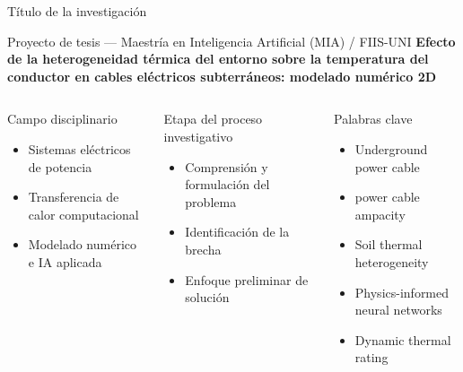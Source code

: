 \documentclass[aspectratio=169]{beamer}
\begin{document}
\begin{frame}{Título de la investigación}
  \begin{block}{Proyecto de tesis --- Maestría en Inteligencia Artificial (MIA) / FIIS-UNI}
    \centering\small
    \textbf{Efecto de la heterogeneidad térmica del entorno sobre la
    temperatura del conductor en cables eléctricos subterráneos:
    modelado numérico 2D}
  \end{block}
  \vspace{0.3em}
  \begin{columns}[T]
      \begin{alertblock}{\small Campo disciplinario}
        \footnotesize
        \begin{itemize}
          \item Sistemas eléctricos de potencia
          \item Transferencia de calor computacional
          \item Modelado numérico e IA aplicada
        \end{itemize}
      \end{alertblock}
      \begin{block}{\small Etapa del proceso investigativo}
        \footnotesize
        \begin{itemize}
          \item Comprensión y formulación del problema
          \item Identificación de la brecha
          \item Enfoque preliminar de solución
        \end{itemize}
      \end{block}
      \begin{exampleblock}{\small Palabras clave}
        \footnotesize
        \begin{itemize}
          \item Underground power cable
          \item power cable ampacity
          \item Soil thermal heterogeneity
          \item Physics-informed neural networks
          \item Dynamic thermal rating
        \end{itemize}
      \end{exampleblock}
  \end{columns}
\end{frame}
\end{document}
